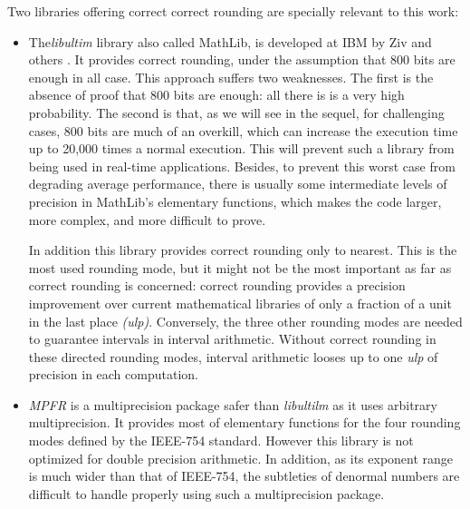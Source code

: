Two libraries offering correct correct rounding are specially relevant to this work:
\begin{itemize}
\item The\emph{libultim} library also called MathLib, is developed at
  IBM by Ziv and others \cite{IBMlibultimweb}. It provides correct rounding,
  under the assumption that 800 bits are enough in all case. This
  approach suffers two weaknesses. The first is the absence of proof
  that 800 bits are enough: all there is is a very high probability.
  The second is that, as we will see in the sequel, for challenging
  cases, 800 bits are much of an overkill, which can increase the
  execution time up to 20,000 times a normal execution. This will
  prevent such a library from being used in real-time applications.
  Besides, to prevent this worst case from degrading average
  performance, there is usually some intermediate levels of precision
  in MathLib's elementary functions, which makes the code larger, more
  complex, and more difficult to prove.
  
  In addition this library provides correct rounding only to nearest.
  This is the most used rounding mode, but it might not be the most
  important as far as correct rounding is concerned: correct rounding
  provides a precision improvement over current mathematical libraries
  of only a fraction of a {unit in the last place} \emph{(ulp)}.
  Conversely, the three other rounding modes are needed to guarantee
  intervals in interval arithmetic.  Without correct rounding in these
  directed rounding modes, interval arithmetic looses up to one
  \emph{ulp} of precision in each computation.
  
\item \emph{MPFR} is a multiprecision package safer than
  \emph{libultilm} as it uses arbitrary multiprecision. It provides
  most of elementary functions for the four rounding modes defined by
  the IEEE-754 standard. However this library is not optimized for
  double precision arithmetic. In addition, as its exponent range is
  much wider than that of IEEE-754, the subtleties of denormal numbers
  are difficult to handle properly using such a multiprecision
  package.
\end{itemize}


